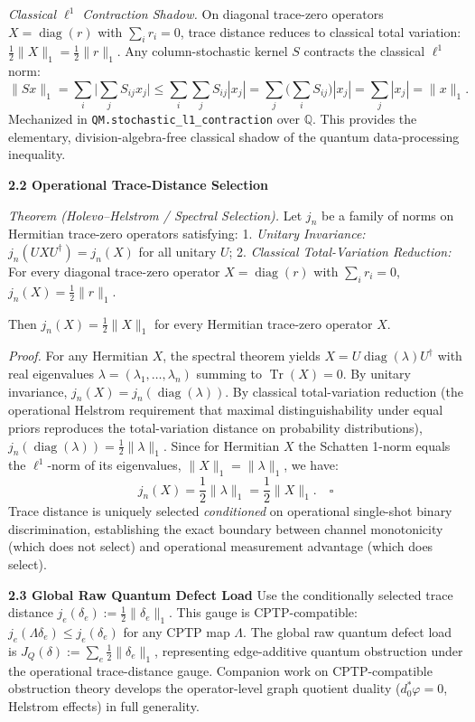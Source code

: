 \documentclass[
  11pt,
]{article}
\begin{document}
\emph{Classical \(\ell^1\) Contraction Shadow.} On diagonal trace-zero operators \(X = \operatorname{diag}(r)\) with \(\sum_i r_i = 0\), trace distance reduces to classical total variation: \(\frac{1}{2}\|X\|_1 = \frac{1}{2}\|r\|_1\). Any column-stochastic kernel \(S\) contracts the classical \(\ell^1\) norm:
\[ \|Sx\|_1 = \sum_i \Big|\sum_j S_{ij} x_j\Big| \le \sum_i \sum_j S_{ij} |x_j| = \sum_j \Big(\sum_i S_{ij}\Big) |x_j| = \sum_j |x_j| = \|x\|_1. \]
Mechanized in \texttt{QM.stochastic\_l1\_contraction} over \(\mathbb{Q}\). This provides the elementary, division-algebra-free classical shadow of the quantum data-processing inequality.

\textbf{2.2 Operational Trace-Distance Selection}

\emph{Theorem (Holevo--Helstrom / Spectral Selection).} Let \(j_n\) be a family of norms on Hermitian trace-zero operators satisfying:
1. \emph{Unitary Invariance:} \(j_n(U X U^\dagger) = j_n(X)\) for all unitary \(U\);
2. \emph{Classical Total-Variation Reduction:} For every diagonal trace-zero operator \(X = \operatorname{diag}(r)\) with \(\sum_i r_i = 0\), \(j_n(X) = \frac{1}{2}\|r\|_1\).

Then \(j_n(X) = \frac{1}{2}\|X\|_1\) for every Hermitian trace-zero operator \(X\).

\emph{Proof.} For any Hermitian \(X\), the spectral theorem yields \(X = U \operatorname{diag}(\lambda) U^\dagger\) with real eigenvalues \(\lambda = (\lambda_1, \ldots, \lambda_n)\) summing to \(\operatorname{Tr}(X) = 0\). By unitary invariance, \(j_n(X) = j_n(\operatorname{diag}(\lambda))\). By classical total-variation reduction (the operational Helstrom requirement that maximal distinguishability under equal priors reproduces the total-variation distance on probability distributions), \(j_n(\operatorname{diag}(\lambda)) = \frac{1}{2}\|\lambda\|_1\). Since for Hermitian \(X\) the Schatten 1-norm equals the \(\ell^1\)-norm of its eigenvalues, \(\|X\|_1 = \|\lambda\|_1\), we have:
\[ j_n(X) = \frac{1}{2}\|\lambda\|_1 = \frac{1}{2}\|X\|_1. \quad \square \]
Trace distance is uniquely selected \emph{conditioned} on operational single-shot binary discrimination, establishing the exact boundary between channel monotonicity (which does not select) and operational measurement advantage (which does select).

\textbf{2.3 Global Raw Quantum Defect Load}
Use the conditionally selected trace distance \(j_e(\delta_e) := \frac{1}{2} \|\delta_e\|_1\). This gauge is CPTP-compatible: \(j_e(\Lambda\delta_e) \le j_e(\delta_e)\) for any CPTP map \(\Lambda\).
The global raw quantum defect load is \(J_Q(\delta) := \sum_e \frac{1}{2} \|\delta_e\|_1\), representing edge-additive quantum obstruction under the operational trace-distance gauge. Companion work on CPTP-compatible obstruction theory develops the operator-level graph quotient duality (\(d_0^*\varphi = 0\), Helstrom effects) in full generality.
\end{document}
